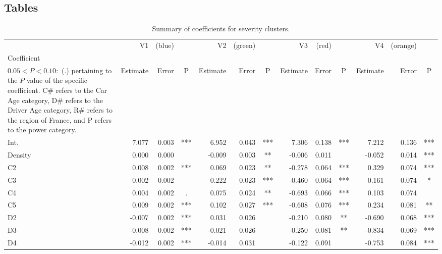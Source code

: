 \documentclass[12pt,letterpaper]{article}
\numberwithin{equation}{section}
\numberwithin{equation}{section}
\numberwithin{equation}{section}
\begin{document}
\begin{center}
\begin{table}

\section{Tables}\label{app:tables}

\caption{ Summary of coefficients for severity clusters.}
\label{severity_coef_table}
\begin{tabular}{|l|rrc|rrc|rrc|rrc|}
\hline\hline
         & V1         & (blue)     &    & V2         & (green)   &    & V3          & (red)     &    & V4          & (orange)     &    \\
Coefficient \footnote{The significance codes are defined as $  P < 0.001 : $  (***), $0.001 < P < 0.01:$ (**), $  0.01 < P < 0.05:$ (*),\\ $0.05 < P < 0.10 : $ (.) %
pertaining to the $P$ value of the specific coefficient. C\# refers to the Car Age category, D\# refers to the Driver Age category, R\# refers to the region of France, and P refers to the power category.  }      & Estimate   & Error     & P   & Estimate   & Error     & P   & Estimate    & Error      & P   & Estimate    & Error      & P   \\ \hline
Int. & 7.077 & 0.003 & *** & 6.952 & 0.043 & *** & 7.306 & 0.138 & *** & 7.212 & 0.136 & *** \\
Density & 0.000 & 0.000 &  & -0.009 & 0.003 & ** & -0.006 & 0.011 &  & -0.052 & 0.014 & *** \\
C2 & 0.008 & 0.002 & *** & 0.069 & 0.023 & ** & -0.278 & 0.064 & *** & 0.329 & 0.074 & *** \\
C3 & 0.002 & 0.002 &  & 0.222 & 0.023 & *** & -0.460 & 0.064 & *** & 0.161 & 0.074 & * \\
C4 & 0.004 & 0.002 & . & 0.075 & 0.024 & ** & -0.693 & 0.066 & *** & 0.103 & 0.074 &  \\
C5 & 0.009 & 0.002 & *** & 0.102 & 0.027 & *** & -0.608 & 0.076 & *** & 0.234 & 0.081 & ** \\
D2 & -0.007 & 0.002 & *** & 0.031 & 0.026 &  & -0.210 & 0.080 & ** & -0.690 & 0.068 & *** \\
D3 & -0.008 & 0.002 & *** & -0.021 & 0.026 &  & -0.250 & 0.081 & ** & -0.834 & 0.069 & *** \\
D4 & -0.012 & 0.002 & *** & -0.014 & 0.031 &  & -0.122 & 0.091 &  & -0.753 & 0.084 & *** \\

\end{tabular}
\end{table}
\end{center}
\end{document}

